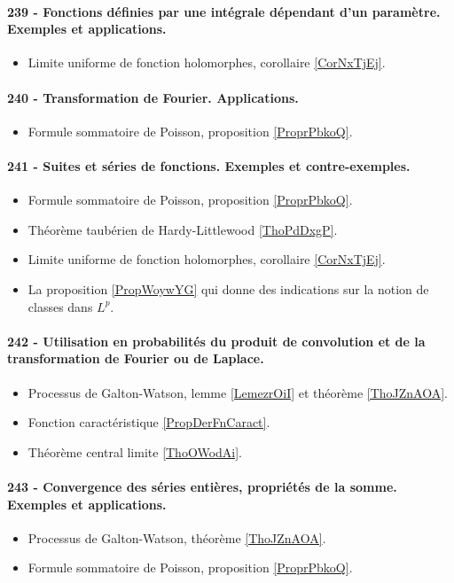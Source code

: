 \paragraph{239 - Fonctions définies par une intégrale dépendant d’un paramètre. Exemples et applications.}
\begin{itemize}
    \item Limite uniforme de fonction holomorphes, corollaire \ref{CorNxTjEj}.
\end{itemize}

\paragraph{240 - Transformation de Fourier. Applications.}
\begin{itemize}
    \item Formule sommatoire de Poisson, proposition \ref{ProprPbkoQ}.
\end{itemize}
\paragraph{241 - Suites et séries de fonctions. Exemples et contre-exemples.}
\begin{itemize}
    \item Formule sommatoire de Poisson, proposition \ref{ProprPbkoQ}.
    \item Théorème taubérien de Hardy-Littlewood \ref{ThoPdDxgP}.
    \item Limite uniforme de fonction holomorphes, corollaire \ref{CorNxTjEj}.
    \item La proposition \ref{PropWoywYG} qui donne des indications sur la notion de classes dans \( L^p\).
\end{itemize}
\paragraph{242 - Utilisation en probabilités du produit de convolution et de la transformation de Fourier ou de Laplace.}
\begin{itemize}
    \item Processus de Galton-Watson, lemme \ref{LemezrOiI} et théorème \ref{ThoJZnAOA}.
    \item Fonction caractéristique \ref{PropDerFnCaract}.
    \item Théorème central limite \ref{ThoOWodAi}.
\end{itemize}

\paragraph{243 - Convergence des séries entières, propriétés de la somme. Exemples et applications.}
\begin{itemize}
    \item Processus de Galton-Watson, théorème \ref{ThoJZnAOA}.
    \item Formule sommatoire de Poisson, proposition \ref{ProprPbkoQ}.
\end{itemize}
